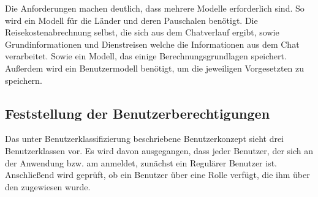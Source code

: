 Die Anforderungen machen deutlich, dass mehrere Modelle erforderlich sind. So wird ein Modell für die Länder und deren Pauschalen benötigt. Die Reisekostenabrechnung selbst, die sich aus dem Chatverlauf ergibt, sowie Grundinformationen und Dienstreisen welche die Informationen aus dem Chat verarbeitet. Sowie ein Modell, das einige Berechnungsgrundlagen speichert. Außerdem wird ein Benutzermodell benötigt, um die jeweiligen Vorgesetzten zu speichern.

\subsection{Feststellung der Benutzerberechtigungen}
\label{sec:Planungsphase:Benutzerberechtigungen}

Das unter Benutzerklassifizierung beschriebene Benutzerkonzept sieht drei Benutzerklassen vor. Es wird davon ausgegangen, dass jeder Benutzer, der sich an der Anwendung bzw. am  anmeldet, zunächst ein Regulärer Benutzer ist. Anschließend wird geprüft, ob ein Benutzer über eine Rolle verfügt, die ihm über den  zugewiesen wurde.
